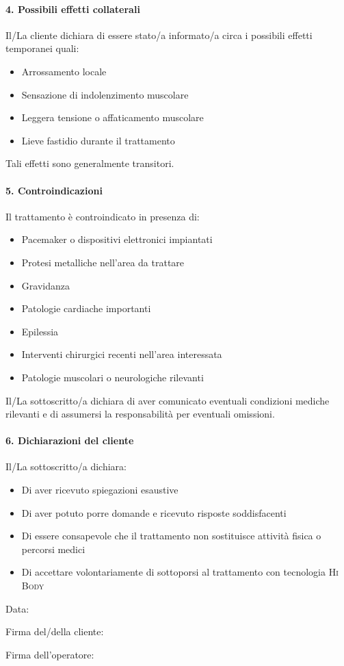 \paragraph*{4. Possibili effetti collaterali}
Il/La cliente dichiara di essere stato/a informato/a circa i possibili effetti temporanei quali:
\begin{itemize}
    \item Arrossamento locale
    \item Sensazione di indolenzimento muscolare
    \item Leggera tensione o affaticamento muscolare
    \item Lieve fastidio durante il trattamento
\end{itemize}
Tali effetti sono generalmente transitori.

\paragraph*{5. Controindicazioni}
Il trattamento è controindicato in presenza di:
\begin{itemize}
    \item Pacemaker o dispositivi elettronici impiantati
    \item Protesi metalliche nell'area da trattare
    \item Gravidanza
    \item Patologie cardiache importanti
    \item Epilessia
    \item Interventi chirurgici recenti nell'area interessata
    \item Patologie muscolari o neurologiche rilevanti
\end{itemize}
Il/La sottoscritto/a dichiara di aver comunicato eventuali condizioni mediche rilevanti e di assumersi la responsabilità per eventuali omissioni.

\paragraph*{6. Dichiarazioni del cliente}
Il/La sottoscritto/a dichiara:
\begin{itemize}
    \item Di aver ricevuto spiegazioni esaustive
    \item Di aver potuto porre domande e ricevuto risposte soddisfacenti
    \item Di essere consapevole che il trattamento non sostituisce attività fisica o percorsi medici
    \item Di accettare volontariamente di sottoporsi al trattamento con tecnologia \textsc{Hi Body}
\end{itemize}

\vspace{1cm}
\noindent
Data: \underline{\hspace{5cm}}

\vspace{0.8cm}
\noindent
Firma del/della cliente: \underline{\hspace{7cm}}

\vspace{0.8cm}
\noindent
Firma dell'operatore: \underline{\hspace{6.5cm}}

